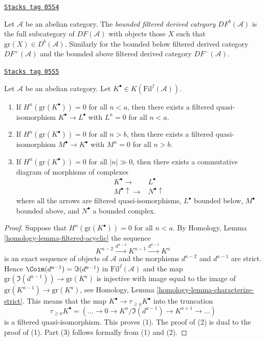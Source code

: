 \begin{definition}
\label{derived-definition-filtered-derived-bounded}
\href{https://stacks.math.columbia.edu/tag/05S4}{\texttt{Stacks tag 05S4}}

Let $\mathcal{A}$ be an abelian category.
The {\it bounded filtered derived category} $DF^b(\mathcal{A})$ is
the full subcategory of $DF(\mathcal{A})$ with objects those $X$
such that $\text{gr}(X) \in D^b(\mathcal{A})$.
Similarly for the bounded below filtered derived category
$DF^{+}(\mathcal{A})$ and the bounded above filtered derived category
$DF^{-}(\mathcal{A})$.
\end{definition}

\begin{lemma}
\label{derived-lemma-filtered-complex-cohomology-bounded}
\href{https://stacks.math.columbia.edu/tag/05S5}{\texttt{Stacks tag 05S5}}

Let $\mathcal{A}$ be an abelian category.
Let $K^\bullet \in K(\text{Fil}^f(\mathcal{A}))$.
\begin{enumerate}
\item If $H^n(\text{gr}(K^\bullet)) = 0$ for all $n < a$, then there exists
a filtered quasi-isomorphism $K^\bullet \to L^\bullet$ with
$L^n = 0$ for all $n < a$.
\item If $H^n(\text{gr}(K^\bullet)) = 0$ for all $n > b$, then there exists
a filtered quasi-isomorphism $M^\bullet \to K^\bullet$ with
$M^n = 0$ for all $n > b$.
\item If $H^n(\text{gr}(K^\bullet)) = 0$ for all $|n| \gg 0$, then there
exists a commutative diagram of morphisms of complexes
$$
\begin{array}{cc}K^\bullet \longrightarrow & L^\bullet \\ M^\bullet \uparrow\longrightarrow & N^\bullet \uparrow\end{array}
$$
where all the arrows are filtered quasi-isomorphisms, $L^\bullet$
bounded below, $M^\bullet$ bounded above, and $N^\bullet$ a bounded
complex.
\end{enumerate}
\end{lemma}

\begin{proof}
Suppose that $H^n(\text{gr}(K^\bullet)) = 0$ for all $n < a$. By
Homology, Lemma \ref{homology-lemma-filtered-acyclic}
the sequence
$$
K^{a - 2} \xrightarrow{d^{a - 2}} K^{a - 1} \xrightarrow{d^{a - 1}} K^a
$$
is an exact sequence of objects of $\mathcal{A}$ and the morphisms
$d^{a - 2}$ and $d^{a - 1}$ are strict. Hence
$\Coim(d^{a - 1}) = \Im(d^{a - 1})$ in $\text{Fil}^f(\mathcal{A})$
and the map $\text{gr}(\Im(d^{a - 1})) \to \text{gr}(K^a)$
is injective with image equal to the image of
$\text{gr}(K^{a - 1}) \to \text{gr}(K^a)$, see
Homology, Lemma \ref{homology-lemma-characterize-strict}.
This means that the map $K^\bullet \to \tau_{\geq a}K^\bullet$
into the truncation
$$
\tau_{\geq a}K^\bullet =
(\ldots \to 0 \to K^a/\Im(d^{a - 1}) \to K^{a + 1} \to \ldots)
$$
is a filtered quasi-isomorphism. This proves (1). The proof of (2)
is dual to the proof of (1). Part (3) follows formally from (1) and (2).
\end{proof}

